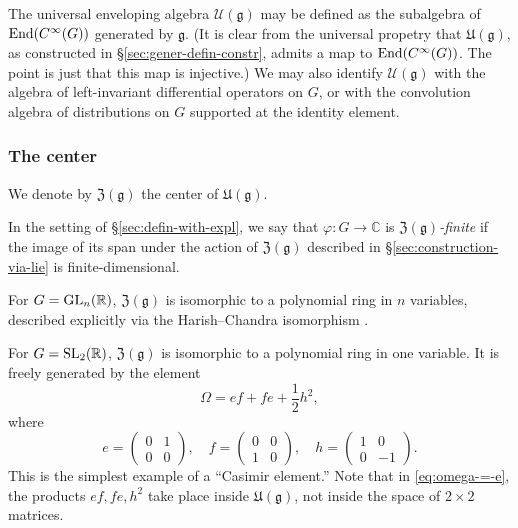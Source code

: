 \documentclass[reqno]{amsart} 
\begin{document}
The universal enveloping algebra $\mathcal{U}(\mathfrak{g})$ may be defined as the subalgebra of $\operatorname{End}(C^\infty(G))$ generated by $\mathfrak{g}$.  (It is clear from the universal propetry that $\mathfrak{U}(\mathfrak{g})$, as constructed in \S\ref{sec:gener-defin-constr}, admits a map to $\operatorname{End}(C^\infty(G))$.  The point is just that this map is injective.)  We may also identify $\mathcal{U}(\mathfrak{g})$ with the algebra of left-invariant differential operators on $G$, or with the convolution algebra of distributions on $G$ supported at the identity element.

\subsubsection{The center}

\begin{definition}
  We denote by $\mathfrak{Z}(\mathfrak{g})$ the center of $\mathfrak{U}(\mathfrak{g})$.
\end{definition}

\begin{definition}
  In the setting of \S\ref{sec:defin-with-expl}, we say that $\varphi : G \rightarrow \mathbb{C}$ is \emph{$\mathfrak{Z}(\mathfrak{g})$-finite} if the image of its span under the action of $\mathfrak{Z}(\mathfrak{g})$ described in \S \ref{sec:construction-via-lie} is finite-dimensional.
\end{definition}

\begin{example}\label{example:stoes2021:g-=-gl_nmathbbr}
  For $G = \operatorname{GL}_n(\mathbb{R})$, $\mathfrak{Z}(\mathfrak{g})$ is isomorphic to a polynomial ring in $n$ variables, described explicitly via the Harish--Chandra isomorphism \cite[p.220]{MR855239}.
\end{example}

\begin{example}\label{exa:g-=-sl_2mathbbr}
  For $G = \operatorname{SL}_2(\mathbb{R})$, $\mathfrak{Z}(\mathfrak{g})$ is isomorphic to a polynomial ring in one variable.  It is freely generated by the element
  \begin{equation}\label{eq:omega-=-e}
    \Omega
    = e f + f e + \frac{1}{2} h ^2,
  \end{equation}
  where
  \begin{equation*}
    e = 
    \begin{pmatrix}
      0 & 1 \\
      0 & 0
    \end{pmatrix}
    , \quad f = 
    \begin{pmatrix}
      0 & 0 \\
      1 & 0
    \end{pmatrix}
    , \quad h = 
    \begin{pmatrix}
      1 & 0 \\
      0 & -1
    \end{pmatrix}
    .
  \end{equation*}
  This is the simplest example of a ``Casimir element.''  Note that in \eqref{eq:omega-=-e}, the products $ef, f e, h^2$ take place inside $\mathfrak{U}(\mathfrak{g})$, not inside the space of $2 \times 2$ matrices.
\end{example}
\end{document}
